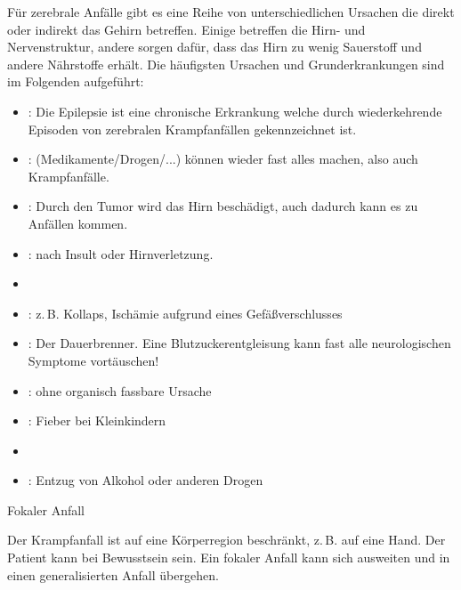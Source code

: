 {%
Für zerebrale Anfälle gibt es eine Reihe von
unterschiedlichen Ursachen die direkt oder indirekt das
Gehirn betreffen. Einige betreffen die Hirn- und
Nervenstruktur, andere sorgen dafür, dass das Hirn zu wenig
Sauerstoff und andere Nährstoffe erhält. Die häufigsten
Ursachen und Grunderkrankungen sind im Folgenden aufgeführt:

\begin{itemize}
  \item {}: Die Epilepsie ist eine chronische
  Erkrankung welche durch wiederkehrende Episoden von
  zerebralen Krampfanfällen gekennzeichnet ist.
  \item {}: (Medikamente/Drogen/...) können
  wieder fast alles machen, also auch Krampfanfälle. \citep{Supady2009}
  \item {}: Durch den Tumor wird das Hirn
  beschädigt, auch dadurch kann es zu Anfällen kommen.
  \item {}: nach Insult oder Hirnverletzung.
  \item {}
  \item {}: z.\,B. Kollaps, Ischämie
  aufgrund eines Gefäßverschlusses
  \item {}: Der Dauerbrenner.
  Eine Blutzuckerentgleisung kann fast alle neurologischen Symptome vortäuschen!
  \item {}: ohne organisch fassbare  Ursache
  \item {}: Fieber bei Kleinkindern
  \item {}
  \item {}: Entzug von Alkohol oder anderen Drogen
\end{itemize}
}{
}{}{}{}




\Text
{Fokaler Anfall}
{%
\label{topic:krampfanfall-fokaler}
Der Krampfanfall ist auf eine Körperregion beschränkt,
z.\,B. auf eine Hand. Der Patient kann bei Bewusstsein sein.
Ein fokaler Anfall kann sich ausweiten und in einen
generalisierten Anfall übergehen.

}
{}
{}
{}
{}


